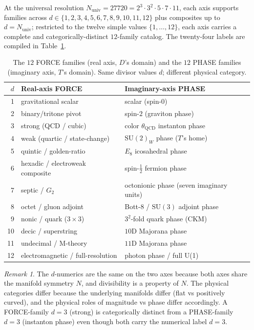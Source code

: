 \documentclass[11pt,a4paper]{article}
\theoremstyle{definition}
\theoremstyle{remark}
\newtheorem{remark}[theorem]{Remark}
\begin{document}
At the universal resolution $N_{\text{univ}} = 27720 = 2^{3}\cdot 3^{2}\cdot 5\cdot 7\cdot 11$, each axis supports families across $d\in\{1,2,3,4,5,6,7,8,9,10,11,12\}$ plus composites up to $d=N_{\text{univ}}$; restricted to the twelve simple values $\{1,\ldots,12\}$, each axis carries a complete and categorically-distinct $12$-family catalog. The twenty-four labels are compiled in Table~\ref{tab:force-phase}.

\begin{table}[h]
\centering\small
\caption{The $12$ FORCE families (real axis, $D$'s domain) and the $12$ PHASE families (imaginary axis, $T$'s domain). Same divisor values $d$; different physical category.}
\label{tab:force-phase}
\begin{tabular}{@{}rll@{}}
\toprule
$d$ & Real-axis FORCE & Imaginary-axis PHASE \\
\midrule
 1 & gravitational scalar                       & scalar (spin-$0$) \\
 2 & binary/tritone pivot                        & spin-$2$ (graviton phase) \\
 3 & strong (QCD / cubic)                        & color $\theta_{\text{QCD}}$ instanton phase \\
 4 & weak (quartic / state-change)               & $\mathrm{SU}(2)_{W}$ phase ($T$'s home) \\
 5 & quintic / golden-ratio                      & $E_{8}$ icosahedral phase \\
 6 & hexadic / electroweak composite             & spin-$\tfrac{1}{2}$ fermion phase \\
 7 & septic / $G_{2}$                            & octonionic phase (seven imaginary units) \\
 8 & octet / gluon adjoint                       & Bott-$8$ / $\mathrm{SU}(3)$ adjoint phase \\
 9 & nonic / quark ($3\times 3$)                 & $3^{2}$-fold quark phase (CKM) \\
10 & decic / superstring                         & $10$D Majorana phase \\
11 & undecimal / M-theory                        & $11$D Majorana phase \\
12 & electromagnetic / full-resolution           & photon phase / full U(1) \\
\bottomrule
\end{tabular}
\end{table}

\begin{remark}
The $d$-numerics are the same on the two axes because both axes share the manifold symmetry $N$, and divisibility is a property of $N$. The physical categories differ because the underlying manifolds differ (flat vs positively curved), and the physical roles of magnitude vs phase differ accordingly. A FORCE-family $d=3$ (strong) is categorically distinct from a PHASE-family $d=3$ (instanton phase) even though both carry the numerical label $d=3$.
\end{remark}
\end{document}
